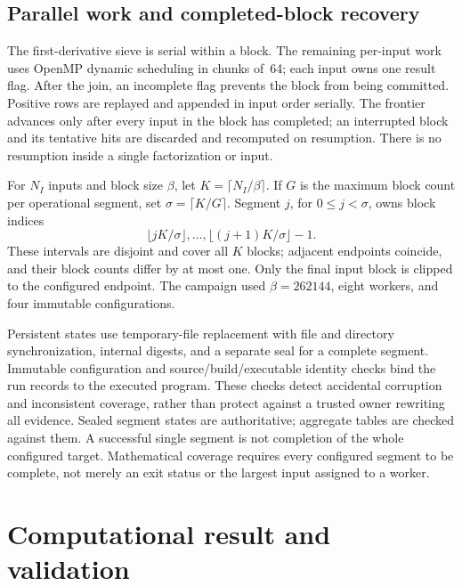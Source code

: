 \documentclass[11pt,a4paper]{article}
\theoremstyle{definition}
\theoremstyle{remark}
\begin{document}
\subsection{Parallel work and completed-block recovery}
The first-derivative sieve is serial within a block. The remaining
per-input work uses OpenMP dynamic scheduling in chunks of~64; each input
owns one result flag. After the join, an incomplete flag prevents the
block from being committed. Positive rows are replayed and appended in
input order serially. The frontier advances only after every input in
the block has completed; an interrupted block and its tentative hits
are discarded and recomputed on resumption. There is no resumption
inside a single factorization or input.

For $N_I$ inputs and block size $\beta$, let $K=\lceil N_I/\beta\rceil$.
If $G$ is the maximum block count per operational segment, set
$\sigma=\lceil K/G\rceil$. Segment $j$, for $0\le j<\sigma$, owns block indices
\[
 \lfloor jK/\sigma\rfloor,\ldots,\lfloor(j+1)K/\sigma\rfloor-1.
\]
These intervals are disjoint and cover all $K$ blocks; adjacent endpoints
coincide, and their block counts differ by at most one. Only the final
input block is clipped to the configured endpoint. The campaign used
$\beta=262144$, eight workers, and four immutable configurations.

Persistent states use temporary-file replacement with file and directory
synchronization, internal digests, and a separate seal for a complete
segment. Immutable configuration and source/build/executable identity
checks bind the run records to the executed program. These checks detect
accidental corruption and inconsistent coverage, rather than protect
against a trusted owner rewriting all evidence. Sealed segment states
are authoritative; aggregate tables are checked against them. A successful
single segment is not completion of the whole configured target.
Mathematical coverage requires every configured segment to be complete,
not merely an exit status or the largest input assigned to a worker.

\section{Computational result and validation}\label{sec:results}
\end{document}
